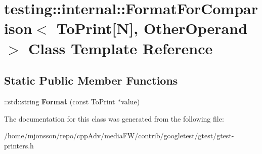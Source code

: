 \hypertarget{classtesting_1_1internal_1_1FormatForComparison_3_01ToPrint[N]_00_01OtherOperand_01_4}{}\section{testing\+:\+:internal\+:\+:Format\+For\+Comparison$<$ To\+Print\mbox{[}N\mbox{]}, Other\+Operand $>$ Class Template Reference}
\label{classtesting_1_1internal_1_1FormatForComparison_3_01ToPrint[N]_00_01OtherOperand_01_4}
\subsection*{Static Public Member Functions}
\begin{DoxyCompactItemize}
\item 
\mbox{\label{classtesting_1_1internal_1_1FormatForComparison_3_01ToPrint[N]_00_01OtherOperand_01_4_a76c526461c8fa7df75f7b32ab889b9e0}} 
\+::std\+::string {\bfseries Format} (const To\+Print $\ast$value)
\end{DoxyCompactItemize}


The documentation for this class was generated from the following file\+:\begin{DoxyCompactItemize}
\item 
/home/mjonsson/repo/cpp\+Adv/media\+F\+W/contrib/googletest/gtest/gtest-\/printers.\+h\end{DoxyCompactItemize}
